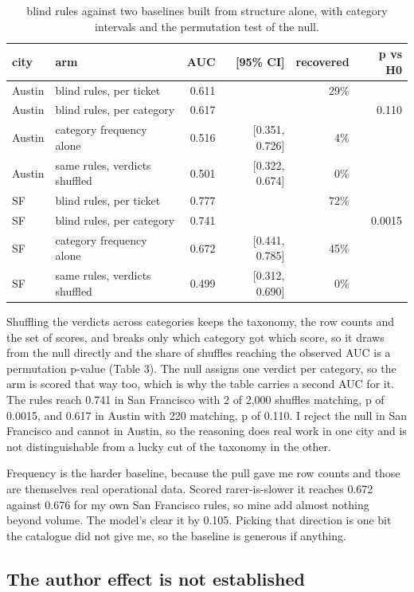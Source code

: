 \documentclass[10pt,a4paper,twocolumn]{article}
\begin{document}
\begin{table}[t]
\centering
\footnotesize
\begin{tabular}{llrrrr}
\toprule
city & arm & AUC & [95\% CI] & recovered & p vs H0 \\
\midrule
Austin & blind rules, per ticket & 0.611 &  & 29\% &  \\
Austin & blind rules, per category & 0.617 &  &  & 0.110 \\
Austin & category frequency alone & 0.516 & [0.351, 0.726] & 4\% &  \\
Austin & same rules, verdicts shuffled & 0.501 & [0.322, 0.674] & 0\% &  \\
SF & blind rules, per ticket & 0.777 &  & 72\% &  \\
SF & blind rules, per category & 0.741 &  &  & 0.0015 \\
SF & category frequency alone & 0.672 & [0.441, 0.785] & 45\% &  \\
SF & same rules, verdicts shuffled & 0.499 & [0.312, 0.690] & 0\% &  \\
\bottomrule
\end{tabular}
\caption{blind rules against two baselines built from structure alone, with category intervals and the permutation test of the null.}
\end{table}

Shuffling the verdicts across categories keeps the taxonomy, the row counts and
the set of scores, and breaks only which category got which score, so it draws
from the null directly and the share of shuffles reaching the observed AUC is a
permutation p-value (Table 3). The null assigns one verdict per category, so the
arm is scored that way too, which is why the table carries a second AUC for it.
The rules reach 0.741 in San Francisco with 2 of 2,000 shuffles matching, p of
0.0015, and 0.617 in Austin with 220 matching, p of 0.110. I reject the null in
San Francisco and cannot in Austin, so the reasoning does real work in one city
and is not distinguishable from a lucky cut of the taxonomy in the other.

Frequency is the harder baseline, because the pull gave me row counts and those
are themselves real operational data. Scored rarer-is-slower it reaches 0.672
against 0.676 for my own San Francisco rules, so mine add almost nothing beyond
volume. The model's clear it by 0.105. Picking that direction is one bit the
catalogue did not give me, so the baseline is generous if anything.

\subsection*{The author effect is not established}
\end{document}
